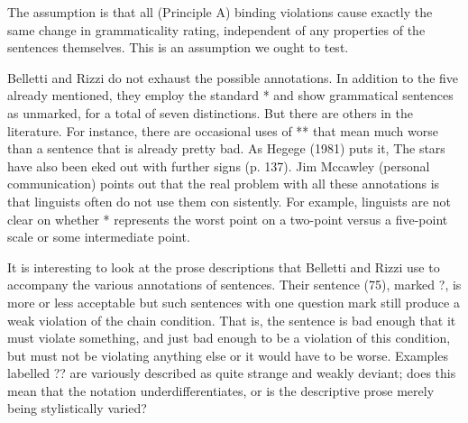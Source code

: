 \begin{styleStandard}
The assumption is that all (Principle A) binding violations cause exactly the same change in grammaticality rating, independent of any properties of the sentences themselves. This is an assumption we ought to test.
\end{styleStandard}


\setcounter{listWWNumlxleveli}{14}
\begin{listWWNumlxleveli}
\item 
\begin{styleStandard}
Belletti and Rizzi do not exhaust the possible annotations. In addition to the five already mentioned, they employ the standard {\textquotedbl}*{\textquotedbl} and show grammatical sentences as unmarked, for a total of seven distinctions. But there are others in the literature. For instance, there are occasional uses of {\textquotedbl}**{\textquotedbl} that mean {\textquotedbl}much worse than a sentence that is already pretty bad.{\textquotedbl} As Hegege (1981) puts it, {\textquotedbl}The stars have also been eked out with further signs{\textquotedbl} (p. 137). Jim Mccawley (personal communication) points out that the real problem with all these annotations is that linguists often do not use them con\- sistently. For example, linguists are not clear on whether {\textquotedbl}*{\textquotedbl} represents the worst point on a two-point versus a five-point scale or some intermediate point.
\end{styleStandard}


\end{listWWNumlxleveli}
\clearpage\setcounter{page}{1}\begin{styleTextbody}
It is interesting to look at the prose descriptions that Belletti and Rizzi use to accompany the various annotations of sentences. Their sentence (75), marked {\textquotedbl}?,{\textquotedbl} is {\textquotedbl}more or less acceptable{\textquotedbl} but such sentences with one question mark {\textquotedbl}still produce a weak violation of the chain condition.{\textquotedbl} That is, the sentence is bad enough that it must violate something, and just bad enough to be a violation of this condition, but must not be violating anything else or it would have to be worse. Examples labelled {\textquotedbl}??{\textquotedbl} are variously described as {\textquotedbl}quite strange{\textquotedbl} and {\textquotedbl}weakly deviant{\textquotedbl}; does this mean that the notation underdifferentiates, or is the descriptive prose merely being stylistically varied?
\end{styleTextbody}


